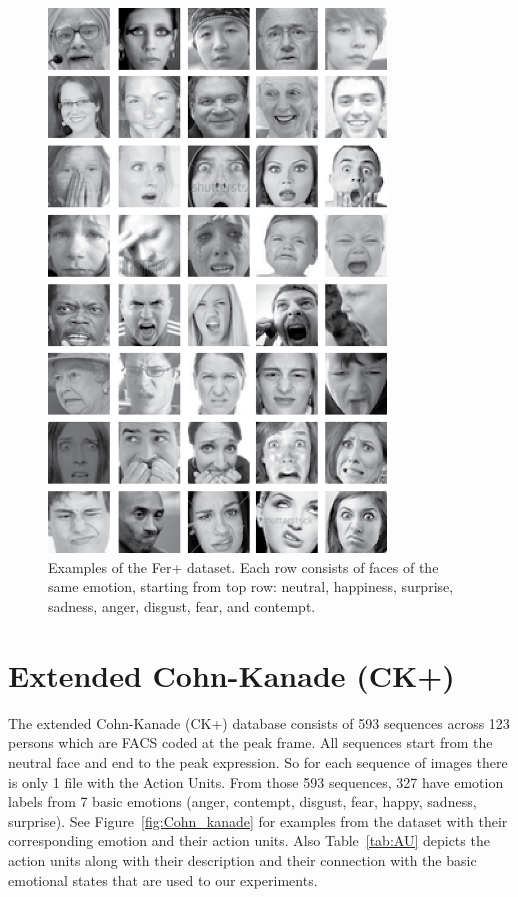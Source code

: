  \begin{figure}[]
    \begin{center}
    \includegraphics[width=0.8\textwidth]{images/ferplus.png}
    \end{center}
    \caption{Examples of the Fer+ dataset. Each row consists of faces of the same emotion, starting from top row: neutral, happiness, surprise, sadness, anger, disgust, fear, and contempt.} \label{fig:ferplus}
\end{figure}

\section{Extended Cohn-Kanade (CK+)}
The extended Cohn-Kanade (CK+) database consists of 593 sequences across 123 persons which are FACS coded at the peak frame. All sequences start from the neutral face and end to the peak expression. So for each sequence of images there is only 1 file with the Action Units. From those 593 sequences, 327 have emotion labels from 7 basic emotions (anger, contempt, disgust, fear, happy, sadness, surprise). See Figure~\ref{fig:Cohn_kanade} for examples from the dataset with their corresponding emotion and their action units. Also Table~\ref{tab:AU} depicts the action units along with their description and their connection with the basic emotional states that are used to our experiments.

